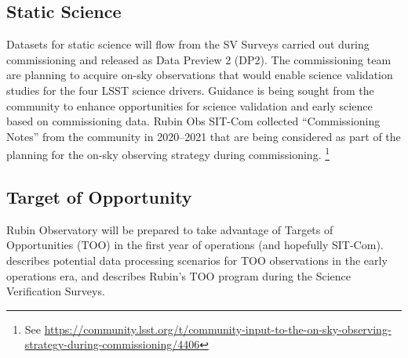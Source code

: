 \subsection{Static Science}

Datasets for static science will flow from the SV Surveys carried out during commissioning and released as Data Preview 2 (DP2).
The commissioning team are planning to acquire on-sky observations that would enable science validation studies for the four LSST science drivers.
Guidance is being sought from the community to enhance opportunities for science validation and early science  based on commissioning data.
Rubin Obs SIT-Com collected ``Commissioning Notes'' from the community in 2020--2021 that are being considered as part of the
planning for the on-sky observing strategy during commissioning. \footnote {See \url{https://community.lsst.org/t/community-input-to-the-on-sky-observing-strategy-during-commissioning/4406}}


\subsection{Target of Opportunity}

Rubin Observatory will be prepared to take advantage of Targets of Opportunities (TOO) in the first year of operations (and hopefully SIT-Com).
 describes potential data processing scenarios for TOO observations in the early operations era, and \cite{RTN-098} describes Rubin's TOO program during the Science Verification Surveys.
